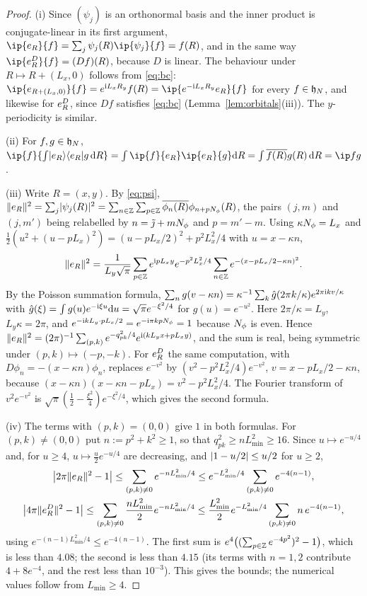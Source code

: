 \begin{proof}
(i) Since $(\psi_j)$ is an orthonormal basis and the inner product is conjugate-linear in its first argument,
$\ip{\ev R}{f}=\sum_j\psi_j(R)\ip{\psi_j}{f}=f(R)$, and in the same way $\ip{\evD R}{f}=(Df)(R)$, because $D$
is linear. The behaviour under $R\mapsto R+(L_x,0)$ follows from \eqref{eq:bc}:
$\ip{\ev{R+(L_x,0)}}{f}=e^{\iu L_xR_y}f(R)=\ip{e^{-\iu L_xR_y}\ev R}{f}$ for every $f\in\mathfrak{h}_N$, and likewise for
$e^{D}_{R}$, since $Df$ satisfies \eqref{eq:bc} (Lemma~\ref{lem:orbitals}(iii)). The $y$-periodicity is similar.

(ii) For $f,g\in\mathfrak{h}_N$, $\ip{f}{\int\lvert\ev R\rangle\langle\ev R\rvert g\,\dd R}=\int\ip{f}{\ev R}\ip{\ev R}{g}\dd R
=\int\overline{f(R)}g(R)\,\dd R=\ip fg$.

(iii) Write $R=(x,y)$. By \eqref{eq:psi},
$\lVert e_{R}\rVert^2=\sum_j\lvert\psi_j(R)\rvert^2=\sum_{n\in\mathbb{Z}}\sum_{p\in\mathbb{Z}}\overline{\phi_n(R)}\phi_{n+pN_{\phi}}(R)$, the pairs
$(j,m)$ and $(j,m')$ being relabelled by $n=\tilde\jmath+mN_{\phi}$ and $p=m'-m$. Using $\kappa N_{\phi}=L_x$ and
$\tfrac12(u^2+(u-pL_x)^2)=(u-pL_x/2)^2+p^2L_x^2/4$ with $u=x-\kappa n$,
\[
\lVert e_{R}\rVert^2=\frac1{L_y\sqrt\pi}\sum_{p\in\mathbb{Z}}e^{\mathrm{i} pL_xy}e^{-p^2L_x^2/4}\sum_{n\in\mathbb{Z}}e^{-(x-pL_x/2-\kappa n)^2}.
\]
By the Poisson summation formula, $\sum_ng(v-\kappa n)=\kappa^{-1}\sum_k\hat g(2\pi k/\kappa)e^{2\pi\mathrm{i} kv/\kappa}$
with $\hat g(\xi)=\int g(u)e^{-\mathrm{i}\xi u}\mathrm{d} u=\sqrt\pi e^{-\xi^2/4}$ for $g(u)=e^{-u^2}$. Here
$2\pi/\kappa=L_y$, $L_y\kappa=2\pi$, and $e^{-\mathrm{i} kL_y\cdot pL_x/2}=e^{-\mathrm{i}\pi kpN_{\phi}}=1$ because $N_{\phi}$ is
even. Hence $\lVert e_{R}\rVert^2=(2\pi)^{-1}\sum_{(p,k)}e^{-q_{pk}^2/4}e^{\mathrm{i}(kL_yx+pL_xy)}$, and the sum is real,
being symmetric under $(p,k)\mapsto(-p,-k)$. For $e^{D}_{R}$ the same computation, with
$D\phi_n=-(x-\kappa n)\phi_n$, replaces $e^{-v^2}$ by $(v^2-p^2L_x^2/4)e^{-v^2}$, $v=x-pL_x/2-\kappa n$,
because $(x-\kappa n)(x-\kappa n-pL_x)=v^2-p^2L_x^2/4$. The Fourier transform of $v^2e^{-v^2}$ is
$\sqrt\pi(\tfrac12-\tfrac{\xi^2}4)e^{-\xi^2/4}$, which gives the second formula.

(iv) The terms with $(p,k)=(0,0)$ give $1$ in both formulas. For $(p,k)\ne(0,0)$ put $n:=p^2+k^2\ge1$, so that
$q_{pk}^2\ge nL_{\min}^2\ge16$. Since $u\mapsto e^{-u/4}$ and, for $u\ge4$, $u\mapsto\frac u2e^{-u/4}$ are
decreasing, and $\lvert1-u/2\rvert\le u/2$ for $u\ge2$,
\begin{gather*}
\bigl\lvert2\pi\lVert e_{R}\rVert^2-1\bigr\rvert\le\sum_{(p,k)\ne0}e^{-nL_{\min}^2/4}
\le e^{-L_{\min}^2/4}\sum_{(p,k)\ne0}e^{-4(n-1)},\\
\bigl\lvert4\pi\lVert e^{D}_{R}\rVert^2-1\bigr\rvert\le\sum_{(p,k)\ne0}\frac{nL_{\min}^2}2e^{-nL_{\min}^2/4}
\le\frac{L_{\min}^2}2e^{-L_{\min}^2/4}\sum_{(p,k)\ne0}n\,e^{-4(n-1)},
\end{gather*}
using $e^{-(n-1)L_{\min}^2/4}\le e^{-4(n-1)}$. The first sum is $e^4\bigl((\sum_{p\in\mathbb{Z}}e^{-4p^2})^2-1\bigr)$, which is
less than $4.08$; the second is less than $4.15$ (its terms with
$n=1,2$ contribute $4+8e^{-4}$, and the rest less than $10^{-3}$). This gives the bounds; the numerical
values follow from $L_{\min}\ge4$.
\end{proof}

